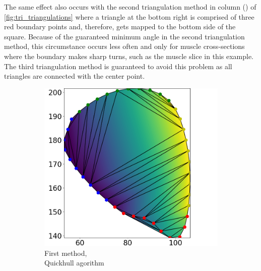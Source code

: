 The same effect also occurs with the second triangulation method in column () of \cref{fig:tri_triangulations} where a triangle at the bottom right is comprised of three red boundary points and, therefore, gets mapped to the bottom side of the square. Because of the guaranteed minimum angle in the second triangulation method, this circumstance occurs less often and only for muscle cross-sections where the boundary makes sharp turns, such as the muscle slice in this example. The third triangulation method is guaranteed to avoid this problem as all triangles are connected with the center point.

\begin{figure}%
  \centering%
  \begin{subfigure}[t]{0.31\textwidth}%
    \centering%
    \includegraphics[width=\textwidth]{images/fiber_creation/u_0.png}%
    \caption{First method,\\Quickhull agorithm}%
    \label{fig:triu_0}%
  \end{subfigure}
  \quad
  \begin{subfigure}[t]{0.31\textwidth}%
    \centering%

\end{subfigure}
\end{figure}
